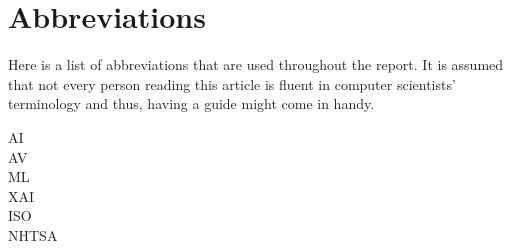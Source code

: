 \section*{Abbreviations}
Here is a list of abbreviations that are used throughout the report. It is assumed that not every person reading this article is fluent in computer scientists' terminology and thus, having a guide might come in handy.


\begin{description}
  \item[\ac{AI}] 
  \item[\ac{AV}] 
  \item[\ac{ML}] 
  \item[\ac{XAI}] 
  \item[\ac{ISO}] 
  \item[\ac{NHTSA}] 
\end{description}